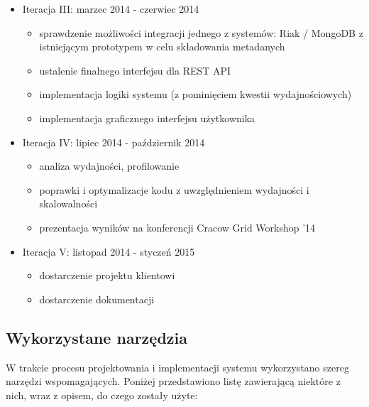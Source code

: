 \begin{itemize}
	\item Iteracja III: marzec 2014 - czerwiec 2014
	\begin{itemize}
		\item sprawdzenie możliwości integracji jednego z systemów: Riak \cite{riak-core-www} / MongoDB \cite{mongo-www} z istniejącym prototypem w celu składowania metadanych
		\item ustalenie finalnego interfejsu dla REST API
		\item implementacja logiki systemu (z pominięciem kwestii wydajnościowych)
		\item implementacja graficznego interfejsu użytkownika
	\end{itemize}
	\item Iteracja IV: lipiec 2014 - październik 2014
	\begin{itemize}
		\item analiza wydajności, profilowanie
		\item poprawki i optymalizacje kodu z uwzględnieniem wydajności i skalowalności
		\item prezentacja wyników na konferencji Cracow Grid Workshop '14
	\end{itemize}
	\item Iteracja V: listopad 2014 - styczeń 2015
	\begin{itemize}
		\item dostarczenie projektu klientowi
		\item dostarczenie dokumentacji
	\end{itemize}
\end{itemize}



\subsection{Wykorzystane narzędzia}
W trakcie procesu projektowania i implementacji systemu wykorzystano szereg narzędzi wspomagających. Poniżej przedstawiono listę zawierającą niektóre z nich, wraz z opisem, do czego zostały użyte:

